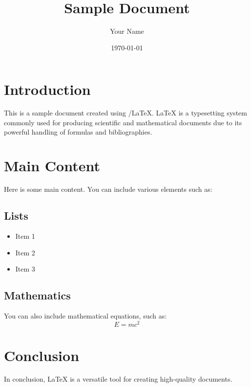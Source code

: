 \documentclass{article}
\title{Sample Document}
\author{Your Name}
\date{\today}
\begin{document}
\maketitle

\section{Introduction}
This is a sample document created using /LaTeX. LaTeX is a typesetting system commonly used for producing scientific and mathematical documents due to its powerful handling of formulas and bibliographies.

\section{Main Content}
Here is some main content. You can include various elements such as:

\subsection{Lists}
\begin{itemize}
    \item Item 1
    \item Item 2
    \item Item 3
\end{itemize}

\subsection{Mathematics}
You can also include mathematical equations, such as:
$$E = mc^2$$

\section{Conclusion}
In conclusion, LaTeX is a versatile tool for creating high-quality documents.
\end{document}
